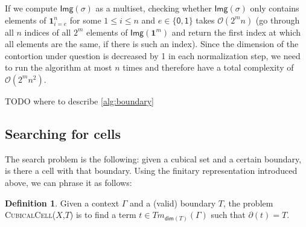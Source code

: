 \documentclass[11pt]{article}
\theoremstyle{definition}
\newtheorem{definition}{Definition}
\newcommand{\todo}[1]{
  \begin{tcolorbox}
    TODO {#1} 
  \end{tcolorbox}
}
\newcommand{\problem}[1]{\textsc{{#1}}}
\newcommand{\pint}[1]{\mathbf{1}^{#1}}
\newcommand{\pintrestr}[3]{\mathbf{1}^{#1}_{{#2}={#3}}}
\newcommand{\izero}{\mathsf{0}}
\newcommand{\ione}{\mathsf{1}}
\newcommand{\image}[1]{\textsf{Img}({#1})}
\renewcommand{\dim}[1]{\mathsf{dim}({#1})}
\newcommand{\cont}[2]{ \ifthenelse{\equal{#2}{}}{#1}{{#1}\langle{#2}\rangle} }
\newcommand{\boundary}[1]{\partial({#1})}
\newcommand{\comp}[2]{\mathsf{Comp}({#1}\ {#2})}
\begin{document}

If we compute $\image{\sigma}$ as a multiset, checking whether 
$\image{\sigma}$ only contains elements of $\pintrestr{n}{i}{e}$ for
some $1 \leq i \leq n$ and $e \in \{\izero,\ione\}$ takes $\mathcal{O}(2^mn)$
(go through all $n$ indices of all $2^m$ elements of $\image{\pint{m}}$ and
return the first index at which all elements are the same, if there is such an index).
Since the dimension of the contortion under question is decreased by 1 in each
normalization step, we need to run the algorithm at most $n$ times and therefore
have a total complexity of $\mathcal{O}(2^mn^2)$.



\todo{where to describe \autoref{alg:boundary} }





\subsection{Searching for cells}

The search problem is the following: given a cubical set and a certain boundary,
is there a cell with that boundary. Using the finitary representation introduced
above, we can phrase it as follows:
  
\begin{definition}
  Given a context $\Gamma$ and a (valid) boundary $T$, the problem
  \problem{CubicalCell}($X$,$T$) is to find a term $t \in Tm_{\dim{T}}(\Gamma)$ such that
  $\boundary{t} = T$.
\end{definition}
\end{document}
